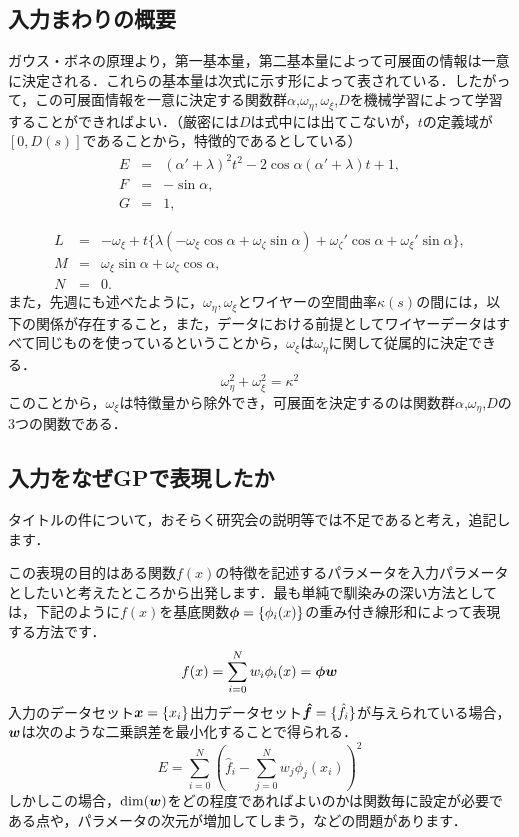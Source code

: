 \documentclass[11pt]{jsarticle}
\begin{document}
		\subsection{入力まわりの概要}
			ガウス・ボネの原理より，第一基本量，第二基本量によって可展面の情報は一意に決定される．これらの基本量は次式に示す形によって表されている．したがって，この可展面情報を一意に決定する関数群$ \alpha $,$ \omega_{\eta} , \omega_{\xi}$,$ D $を機械学習によって学習することができればよい．（厳密には$ D $は式中には出てこないが，$ t $の定義域が$ [0,D(s)] $であることから，特徴的であるとしている）
			\begin{eqnarray}
			E &=& (\alpha'+\lambda)^2 t^2 -2\cos \alpha(\alpha'+\lambda) t + 1,\\
			F &=& -\sin \alpha,\\
			G &=& 1,
			\end{eqnarray}
			
			\begin{eqnarray}
			L &=& -\omega_{\xi}+t\{\lambda(-\omega_{\xi}\cos \alpha + \omega_{\zeta}\sin \alpha)+\omega_{\zeta}'\cos \alpha + \omega_{\xi}'\sin \alpha \},  \\
			M &=& \omega_{\xi}\sin \alpha + \omega_{\zeta} \cos \alpha,  \\
			N &=& 0. 
			\end{eqnarray}
			また，先週にも述べたように，$  \omega_{\eta} , \omega_{\xi} $とワイヤーの空間曲率$ \kappa (s) $の間には，以下の関係が存在すること，また，データにおける前提としてワイヤーデータはすべて同じものを使っているということから，$ \omega_{\xi} $は$ \omega_{\eta} $に関して従属的に決定できる．
			\begin{equation}\label{eq:kappaeq}
			\omega_{\eta}^2 + \omega_{\xi}^2 = \kappa^2
			\end{equation}
			このことから，$ \omega_{\xi} $は特徴量から除外でき，可展面を決定するのは関数群$ \alpha $,$ \omega_{\eta} $,$ D $の3つの関数である．
		\subsection{入力をなぜGPで表現したか}
			タイトルの件について，おそらく研究会の説明等では不足であると考え，追記します．
			
			この表現の目的はある関数$ f(x) $の特徴を記述するパラメータを入力パラメータとしたいと考えたところから出発します．最も単純で馴染みの深い方法としては，下記のように$ f(x) $を基底関数$ \boldsymbol{\phi} = \{ \phi_i(x) \} $の重み付き線形和によって表現する方法です．
			\begin{equation}\label{eq:LinearEq}
				f(x) = \sum_{i=0}^{N} w_i \phi_i(x)  = \boldsymbol{\phi} \boldsymbol{w}
			\end{equation}
			入力のデータセット$ \boldsymbol{x} = \{x_i\} $出力データセット$ \boldsymbol{\hat{f}} = \{\hat{f}_i\}$が与えられている場合，$ \boldsymbol{w} $は次のような二乗誤差を最小化することで得られる．
			\begin{equation}\label{eq:ErrorToMinimize}
				E =  \sum_{i=0}^{N} (\hat{f}_i - \sum_{j=0}^{N} w_j \phi_j(x_i))^2
			\end{equation}
			しかしこの場合，$ \dim(\boldsymbol{w}) $をどの程度であればよいのかは関数毎に設定が必要である点や，パラメータの次元が増加してしまう，などの問題があります．
			
\end{document}
